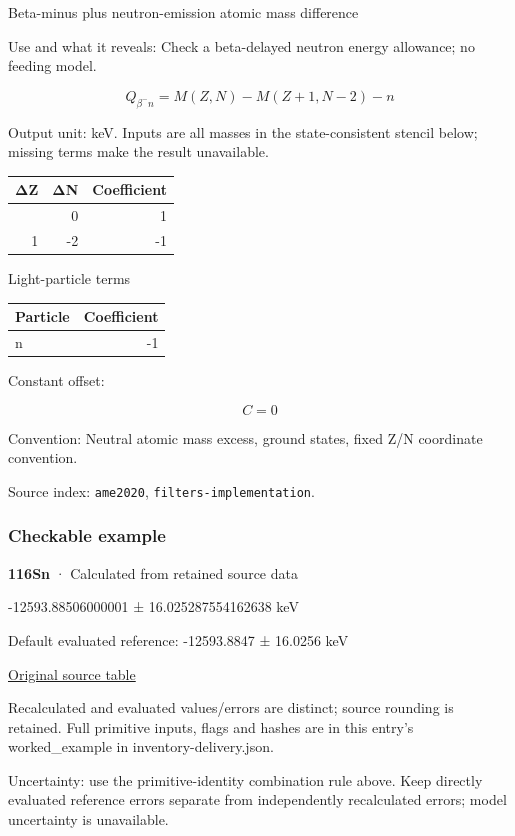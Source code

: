 \documentclass[
  11pt,
  letterpaper,
]{article}
\begin{document}
Beta-minus plus neutron-emission atomic mass difference

Use and what it reveals: Check a beta-delayed neutron energy allowance;
no feeding model.

\[
Q_{\beta^-n}=M(Z,N)-M(Z+1,N-2)-n
\]

Output unit: keV. Inputs are all masses in the state-consistent stencil
below; missing terms make the result unavailable.

\begin{longtable}[]{@{}rrr@{}}
\toprule\noalign{}
ΔZ & ΔN & Coefficient \\
\midrule\noalign{}
\endhead
\bottomrule\noalign{}
\endlastfoot
0 & 0 & 1 \\
1 & -2 & -1 \\
\end{longtable}

Light-particle terms

\begin{longtable}[]{@{}lr@{}}
\toprule\noalign{}
Particle & Coefficient \\
\midrule\noalign{}
\endhead
\bottomrule\noalign{}
\endlastfoot
n & -1 \\
\end{longtable}

Constant offset:

\[
C=0
\]

Convention: Neutral atomic mass excess, ground states, fixed Z/N
coordinate convention.

Source index: \texttt{ame2020}, \texttt{filters-implementation}.

\subsubsection{Checkable example}\label{checkable-example-16}

\textbf{116Sn} · Calculated from retained source data

-12593.88506000001 ± 16.025287554162638 keV

Default evaluated reference: -12593.8847 ± 16.0256 keV

\href{https://www-nds.iaea.org/amdc/ame2020/rct1.mas20.txt}{Original
source table}

Recalculated and evaluated values/errors are distinct; source rounding
is retained. Full primitive inputs, flags and hashes are in this entry's
worked\_example in inventory-delivery.json.

Uncertainty: use the primitive-identity combination rule above. Keep
directly evaluated reference errors separate from independently
recalculated errors; model uncertainty is unavailable.
\end{document}
